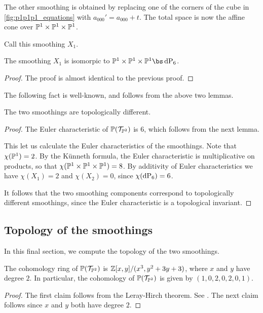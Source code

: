 The other smoothing is obtained by replacing one of the corners of the cube in \cref{fig:p1p1p1_equations} with $a_{000}'=a_{000}+t$. The total space is now the affine cone over $\P^1 \times \P^1 \times \P^1$. 

Call this smoothing $X_1.$

\begin{lemma}
The smoothing $X_1$ is isomorpic to $\P^1 \times \P^1 \times \P^1 \bs \dP6$.
\end{lemma}
\begin{proof}
The proof is almost identical to the previous proof.
\end{proof}

The following fact is well-known, and follows from the above two lemmas.

\begin{proposition}
The two smoothings are topologically different.
\end{proposition}
\begin{proof}
The Euler characteristic of $\P(\mathcal T_{\P^2})$ is $6$, which follows from the next lemma.

This let us calculate the Euler characteristics of the smoothings. Note that $\chi(\P^1)=2$. By the Künneth formula, the Euler characteristic is multiplicative on products, so that $\chi(\P^1 \times \P^1 \times \P^1)=8$. By additivity of Euler characteristics we have $\chi(X_1)=2$ and $\chi(X_2)=0$, since $\chi(\dP6)=6$.

It follows that the two smoothing components correspond to topologically different smoothings, since the Euler characteristic is a topological invariant.
\end{proof}

\subsection{Topology of the smoothings}

In this final section, we compute the topology of the two smoothings.

\begin{lemma}
The cohomology ring of $\P(\mathcal T_{\P^2})$ is $\Z[x,y]/(x^3,y^2+3y+3)$, where $x$ and $y$ have degree $2$. In particular, the cohomology of $\P(\mathcal T_{\P^2})$ is given by $(1,0,2,0,2,0,1)$.
\end{lemma}
\begin{proof}
The first claim follows from the Leray-Hirch theorem. See \cite[page 270]{bott_tu}. The next claim follows since $x$ and $y$ both have degree $2$.
\end{proof}

